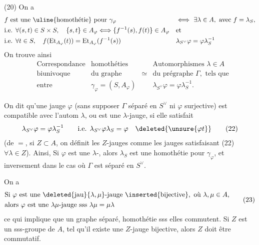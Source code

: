 (20) On a 
\[
\begin{aligned}
&f\text{ est une \uline{homothétie} pour }\gamma_\varphi
 &&\Longleftrightarrow\ \exists\lambda\in A,\text{ avec }f=\lambda_S,\\
&\text{i.e. }\forall(s,t)\in S\times S,\quad\{s,t\}\in A_\varphi\Longleftrightarrow
 \{f^{-1}(s),f(t)\}\in A_\varphi &&\text{et}\\
&\text{i.e. }\forall t\in S,\quad f(\mathrm{Et}_{A_\varphi}(t))=\mathrm{Et}_{A_\varphi}(f^{-1}(s))
 &&\lambda_{S^\vee}\varphi=\varphi\lambda_S^{-1}
\end{aligned}
\]
On trouve ainsi
\[
 \begin{aligned}
 &\text{Correspondance} &\text{homothéties} &&\text{Automorphismes }\lambda\in A\\
 &\text{biunivoque} &\text{du graphe} &\simeq&\text{du prégraphe }\Gamma,\text{ tels que}\\
 &\text{entre} &\gamma_\varphi=(S,A_\varphi) &&\lambda_{S^\vee}\varphi=\varphi\lambda_S^{-1}.
 \end{aligned}\tag*{(21)}
\]

On dit qu'une jauge $\varphi$  (sans supposer  $\Gamma$
séparé en $S^\vee$ ni $\varphi$ surjective) est compatible avec
l'autom $\lambda$, ou est une $\lambda$-jauge, si elle satisfait
\[
 \lambda_{S^\vee}\varphi=\varphi\lambda_S^{-1}\qquad\text{i.e. }\lambda_{S^\vee}\varphi\lambda_S=\varphi
 \quad\deleted{\unsure{\varphi t}}\tag*{(22)}
\]
(de $=$, si $Z\subset A$, on définit les $Z$-jauges
comme les jauges satisfaisant (22) $\forall\lambda\in Z$).
Ainsi, Si $\varphi$ est une $\lambda$-, alors \deleted{\unsure{\varphi}} $\lambda_S$ est
une homothétie pour $\gamma_\varphi$, et inversement dans
le cas où $\Gamma$ est séparé en $S^\vee$.

 On a
\[
\begin{aligned}
&\text{Si }\varphi\text{ est une }\deleted{\text{jau}}\{\lambda,\mu\}\text{-jauge }\inserted{\text{bijective}},
 \text{ où }\lambda,\mu\in A,\\
&\text{alors }\varphi\text{ est une }\lambda\mu\text{-jauge sss }\lambda\mu=\mu\lambda
\end{aligned}\tag*{(23)}
\]
ce qui implique que  un graphe séparé,
   homothétie sss elles commutent.
Si $Z$ est un sss-groupe de $A$, tel qu'il existe une $Z$-jauge
bijective, alors $Z$ doit être commutatif.

